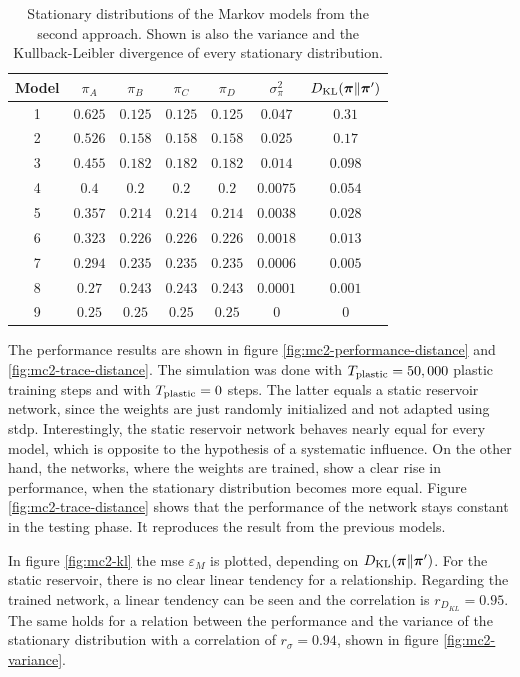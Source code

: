 \begin{table}[!t]
\centering
\begin{tabular}{c|cccc|cc}
Model & $\pi_A$ & $\pi_B$ & $\pi_C$ & $\pi_D$ & $\sigma^2_\pi$ & $D_{\text{KL}}(\bm\pi\|\bm\pi')$ \\
\hline
1 & $0.625$ & $0.125$ & $0.125$ & $0.125$ & $0.047$ & $0.31$ \\
2 & $0.526$ & $0.158$ & $0.158$ & $0.158$ & $0.025$ & $0.17$ \\
3 & $0.455$ & $0.182$ & $0.182$ & $0.182$ & $0.014$ & $0.098$ \\
4 & $0.4$ & $0.2$ & $0.2$ & $0.2$ & $0.0075$ & $0.054$ \\
5 & $0.357$ & $0.214$ & $0.214$ & $0.214$ & $0.0038$ & $0.028$ \\
6 & $0.323$ & $0.226$ & $0.226$ & $0.226$ & $0.0018$ & $0.013$ \\
7 & $0.294$ & $0.235$ & $0.235$ & $0.235$ & $0.0006$ & $0.005$ \\
8 & $0.27$ & $0.243$ & $0.243$ & $0.243$ & $0.0001$ & $0.001$ \\
9 & $0.25$ & $0.25$ & $0.25$ & $0.25$ & $0$ & $0$
\end{tabular}
\vspace{5pt}
\caption[Stationary distributions of model series II]{Stationary distributions of the Markov models from the second approach. Shown is also the variance and the Kullback-Leibler divergence of every stationary distribution.}
\label{tb:mc2-stat}
\end{table}

The performance results are shown in figure \ref{fig:mc2-performance-distance} and \ref{fig:mc2-trace-distance}. The simulation was done with $T_{\text{plastic}} = 50,000$ plastic training steps and with $T_{\text{plastic}} = 0$ steps. The latter equals a static reservoir network, since the weights are just randomly initialized and not adapted using \acs{stdp}. Interestingly, the static reservoir network behaves nearly equal for every model, which is opposite to the hypothesis of a systematic influence. On the other hand, the networks, where the weights are trained, show a clear rise in performance, when the stationary distribution becomes more equal. Figure \ref{fig:mc2-trace-distance} shows that the performance of the network stays constant in the testing phase. It reproduces the result from the previous models.

In figure \ref{fig:mc2-kl} the \acs{mse} $\varepsilon_M$ is plotted, depending on $D_{\text{KL}}(\bm\pi\|\bm\pi')$. For the static reservoir, there is no clear linear tendency for a relationship. Regarding the trained network, a linear tendency can be seen and the correlation is $r_{D_{KL}} = 0.95$. The same holds for a relation between the performance and the variance of the stationary distribution with a correlation of $r_\sigma = 0.94$, shown in figure \ref{fig:mc2-variance}.

